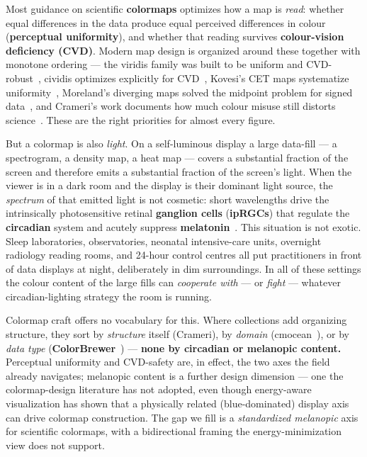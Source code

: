 \documentclass[10pt,a4paper,twocolumn]{article}
\begin{document}
Most guidance on scientific \textbf{colormaps} optimizes how a map is \emph{read}: whether equal differences in the data produce equal perceived differences in colour (\textbf{perceptual uniformity}), and whether that reading survives \textbf{colour-vision deficiency (CVD)}.
Modern map design is organized around these together with monotone ordering --- the viridis family was built to be uniform and CVD-robust~\cite{smith2015viridis}, cividis optimizes explicitly for CVD~\cite{nunez2018cividis}, Kovesi's CET maps systematize uniformity~\cite{kovesi2015colourmaps}, Moreland's diverging maps solved the midpoint problem for signed data~\cite{moreland2009diverging}, and Crameri's work documents how much colour misuse still distorts science~\cite{crameri2020colour}.
These are the right priorities for almost every figure.

\par
But a colormap is also \emph{light}.
On a self-luminous display a large data-fill --- a spectrogram, a density map, a heat map --- covers a substantial fraction of the screen and therefore emits a substantial fraction of the screen's light.
When the viewer is in a dark room and the display is their dominant light source, the \emph{spectrum} of that emitted light is not cosmetic: short wavelengths drive the intrinsically photosensitive retinal \textbf{ganglion cells} (\textbf{ipRGCs}) that regulate the \textbf{circadian} system and acutely suppress \textbf{melatonin}~\cite{lucas2014melanopsin,brown2020melanopic}.
This situation is not exotic.
Sleep laboratories, observatories, neonatal intensive-care units, overnight radiology reading rooms, and 24-hour control centres all put practitioners in front of data displays at night, deliberately in dim surroundings.
In all of these settings the colour content of the large fills can \emph{cooperate with} --- or \emph{fight} --- whatever circadian-lighting strategy the room is running.

\par
Colormap craft offers no vocabulary for this.
Where collections add organizing structure, they sort by \emph{structure} itself (Crameri), by \emph{domain} (cmocean~\cite{thyng2016cmocean}), or by \emph{data type} (\textbf{ColorBrewer}~\cite{harrower2003colorbrewer}) --- \textbf{none by circadian or melanopic content.}
Perceptual uniformity and CVD-safety are, in effect, the two axes the field already navigates; melanopic content is a further design dimension --- one the colormap-design literature has not adopted, even though energy-aware visualization has shown that a physically related (blue-dominated) display axis can drive colormap construction.
The gap we fill is a \emph{standardized melanopic} axis for scientific colormaps, with a bidirectional framing the energy-minimization view does not support.
\end{document}
